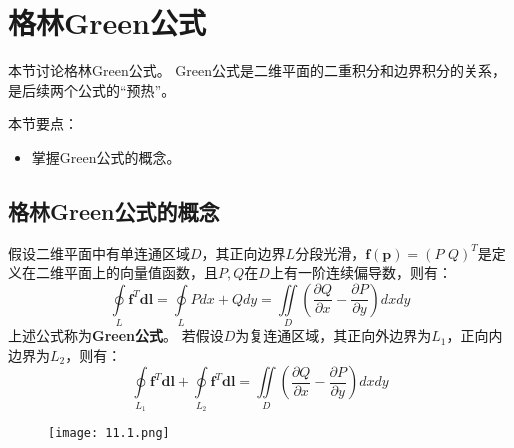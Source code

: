 \section{格林Green公式}

本节讨论格林Green公式。
Green公式是二维平面的二重积分和边界积分的关系，是后续两个公式的“预热”。

本节要点：
\begin{itemize}
    \item 掌握Green公式的概念。
\end{itemize}

\subsection{格林Green公式的概念}

\begin{definition}[Green公式]
假设二维平面中有单连通区域$D$，其正向边界$L$分段光滑，$\boldsymbol{f}\left( \boldsymbol{p} \right) =\left( P\,\,Q \right) ^T$是定义在二维平面上的向量值函数，且$P,Q$在$D$上有一阶连续偏导数，则有：
\[
\oint\limits_L{\boldsymbol{f}^T\boldsymbol{dl}}=\oint\limits_L{Pdx+Qdy}=\iint\limits_D{\left( \frac{\partial Q}{\partial x}-\frac{\partial P}{\partial y} \right) dxdy}
\]
上述公式称为{\bf Green公式}。
若假设$D$为复连通区域，其正向外边界为$L_1$，正向内边界为$L_2$，则有：
\[
\oint\limits_{L_1}{\boldsymbol{f}^T\boldsymbol{dl}}+\oint\limits_{L_2}{\boldsymbol{f}^T\boldsymbol{dl}}=\iint\limits_D{\left( \frac{\partial Q}{\partial x}-\frac{\partial P}{\partial y} \right) dxdy}
\]
\end{definition}

\begin{figure}[h]
\centering
\texttt{[image: 11.1.png]}
\end{figure}




